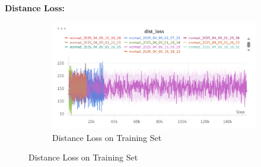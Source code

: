 \documentclass[12pt]{article}
\begin{document}
\noindent \textbf{Distance Loss:}\\
\begin{figure}[H]
    \centering
    \begin{subfigure}[b]{0.48\textwidth}
        \centering
        \includegraphics[width=\textwidth]{images/dist_loss.png}
        \caption{Distance Loss on Training Set}
        \label{fig:dist_loss}
    \end{subfigure}
    \end{figure}
\end{document}
